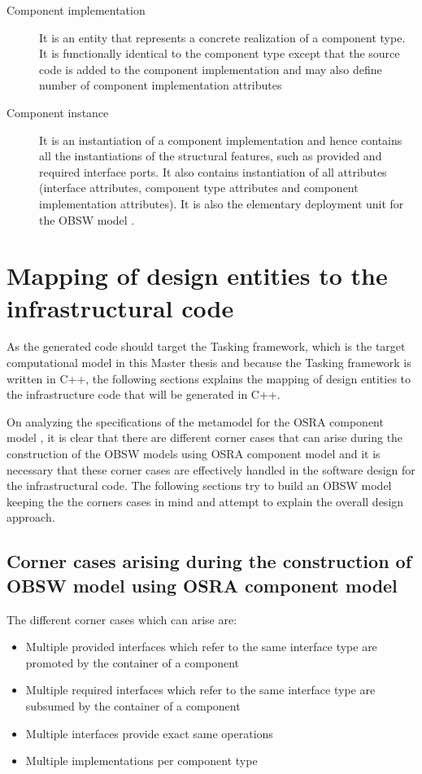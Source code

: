 \begin{description}
\item [Component implementation] It is an entity that represents a concrete realization of a component type. It is functionally identical to the component type except that the source code is added to the component implementation and may also define number of component implementation attributes

\item [Component instance] It is an instantiation of a component implementation and hence contains all the instantiations of the structural features, such as provided and required interface ports. It also contains instantiation of all attributes (interface attributes, component type attributes and component implementation attributes). It is also the elementary deployment unit for the OBSW model \cite{SpecMetamodel}.        
\end{description}

\section{Mapping of design entities to the infrastructural code}
As the generated code should target the Tasking framework, which is the target computational model in this Master thesis and because the Tasking framework is written in C++, the following sections explains the mapping of design entities to the infrastructure code that will be generated in C++.

On analyzing the specifications of the metamodel for the OSRA component model \cite{SpecMetamodel}, it is clear that there are different corner cases that can arise during the construction of the OBSW models using OSRA component model and it is necessary that these corner cases are effectively handled in the software design for the infrastructural code. The following sections try to build an OBSW model keeping the the corners cases in mind and attempt to explain the overall design approach.

\subsection{Corner cases arising during the construction of OBSW model using OSRA component model}
\label{section: Corner cases}
The different corner cases which can arise are:

\begin{itemize}
\item Multiple provided interfaces which refer to the same interface type are promoted by the container of a component
\item Multiple required interfaces which refer to the same interface type are subsumed by the container of a component
\item Multiple interfaces provide exact same operations
\item Multiple implementations per component type
\end{itemize}

